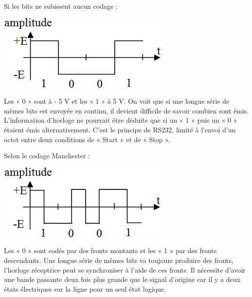 \documentclass[10pt]{article}
\begin{document}
\begin{minipage}[c]{.48\linewidth}
Si les bits ne subissent aucun codage :

\begin{center}
\includegraphics[width=.8\textwidth]{images/fig_06}
\end{center}

Les « 0 » sont à - 5 V et les « 1 » à 5 V.
On voit que si une longue série de mêmes bits est envoyée en continu, il devient difficile de savoir combien sont émis. L’information d’horloge ne pourrait être déduite que si un « 1 » puis un « 0 » étaient émis alternativement. C’est le principe de RS232, limité à l’envoi d’un octet entre deux conditions de « Start » et de « Stop ».


\end{minipage}  \hfill
\begin{minipage}[c]{.48\linewidth}
Selon le codage Manchester :

\begin{center}
\includegraphics[width=.8\textwidth]{images/fig_07}
\end{center}

Les « 0 » sont codés par des fronts montants et les « 1 » par des fronts descendants.
Une longue série de mêmes bits va toujours produire des fronts, l’horloge réceptrice peut se synchroniser à l’aide de ces fronts.
Il nécessite d’avoir une bande passante deux fois plus grande que le signal d’origine car il y a deux états électriques sur la ligne pour un seul état logique.

\end{minipage} 
\end{document}
